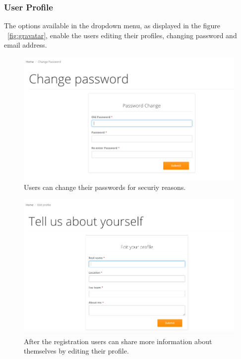 \subsubsection*{User Profile}
The options available in the dropdown menu, as displayed in the figure ~\ref{fig:gravatar}, enable the users editing their profiles, changing password and email address. 

\begin{figure}[H]
	\begin{center}
		\includegraphics[width=.90\columnwidth]{impl/images/changePassword}
		\caption{Users can change their passwords for securiy reasons.} \label{fig:changePassword}
	\end{center}
\end{figure}

\begin{figure}[H]
	\begin{center}
		\includegraphics[width=.90\columnwidth]{impl/images/editProfile}
		\caption{After the registration users can share more information about themselves by editing their profile.} \label{fig:editprofile}
	\end{center}
\end{figure}

